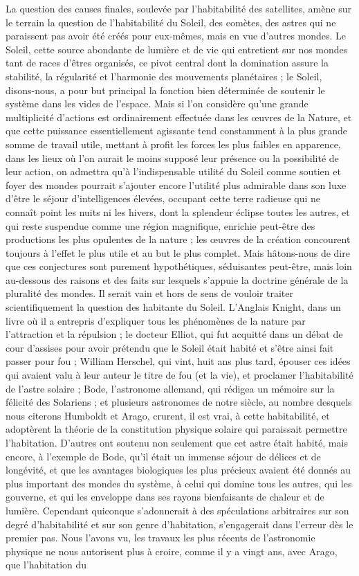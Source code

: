 \documentclass[a4paper, 11pt, oneside]{article}
\begin{document}
La question des causes finales, soulevée par l'habitabilité des satellites, amène sur le terrain la question de l'habitabilité du Soleil, des comètes, des astres qui ne paraissent pas avoir été créés pour eux-mêmes, mais en vue d'autres mondes. Le Soleil, cette source abondante de lumière et de vie qui entretient sur nos mondes tant de races d'êtres organisés, ce pivot central dont la domination assure la stabilité, la régularité et l'harmonie des mouvements planétaires ; le Soleil, disons-nous, a pour but principal la fonction bien déterminée de soutenir le système dans les vides de l'espace. Mais si l'on considère qu'une grande multiplicité d'actions est ordinairement effectuée dans les œuvres de la Nature, et que cette puissance essentiellement agissante tend constamment à la plus grande somme de travail utile, mettant à profit les forces les plus faibles en apparence, dans les lieux où l'on aurait le moins supposé leur présence ou la possibilité de leur action, on admettra qu'à l'indispensable utilité du Soleil comme soutien et foyer des mondes pourrait s'ajouter encore l'utilité plus admirable dans son luxe d'être le séjour d'intelligences élevées, occupant cette terre radieuse qui ne connaît point les nuits ni les hivers, dont la splendeur éclipse toutes les autres, et qui reste suspendue comme une région magnifique, enrichie peut-être des productions les plus opulentes de la nature ; les œuvres de la création concourent toujours à l'effet le plus utile et au but le plus complet. Mais hâtons-nous de dire que ces conjectures sont purement hypothétiques, séduisantes peut-être, mais loin au-dessous des raisons et des faits sur lesquels s'appuie la doctrine générale de la pluralité des mondes. Il serait vain et hors de sens de vouloir traiter scientifiquement la question des habitante du Soleil. L'Anglais Knight, dans un livre où il a entrepris d'expliquer tous les phénomènes de la nature par l'attraction et la répulsion ; le docteur Elliot, qui fut acquitté dans un débat de cour d'assises pour avoir prétendu que le Soleil était habité et s'être ainsi fait passer pour fou ; William Herschel, qui vint, huit ans plus tard, épouser ces idées qui avaient valu à leur auteur le titre de fou (et la vie), et proclamer l'habitabilité de l'astre solaire ; Bode, l'astronome allemand, qui rédigea un mémoire sur la félicité des Solariens ; et plusieurs astronomes de notre siècle, au nombre desquels nous citerons Humboldt et Arago, crurent, il est vrai, à cette habitabilité, et adoptèrent la théorie de la constitution physique solaire qui paraissait permettre l'habitation. D'autres ont soutenu non seulement que cet astre était habité, mais encore, à l'exemple de Bode, qu'il était un immense séjour de délices et de longévité, et que les avantages biologiques les plus précieux avaient été donnés au plus important des mondes du système, à celui qui domine tous les autres, qui les gouverne, et qui les enveloppe dans ses rayons bienfaisants de chaleur et de lumière. Cependant quiconque s'adonnerait à des spéculations arbitraires sur son degré d'habitabilité et sur son genre d'habitation, s'engagerait dans l'erreur dès le premier pas. Nous l'avons vu, les travaux les plus récents de l'astronomie physique ne nous autorisent plus à croire, comme il y a vingt ans, avec Arago, que l'habitation du 
\end{document}
